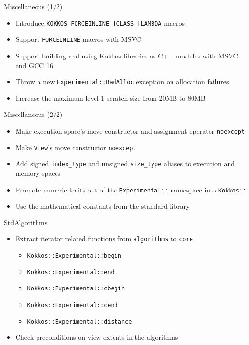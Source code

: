 \begin{frame}[fragile]{Miscellaneous (1/2)}
  \begin{itemize}
    \item Introduce \texttt{KOKKOS\_FORCEINLINE\_[CLASS\_]LAMBDA} macros
    \item Support \texttt{FORCEINLINE} macros with MSVC
    \item Support building and using Kokkos libraries as C++ modules with MSVC and GCC 16
    \item Throw a new \texttt{Experimental::BadAlloc} exception on allocation failures
    \item Increase the maximum level 1 scratch size from 20MB to 80MB
  \end{itemize}
\end{frame}


\begin{frame}[fragile]{Miscellaneous (2/2)}
  \begin{itemize}
    \item Make execution space's move constructor and assignment operator \texttt{noexcept}
    \item Make \texttt{View}'s move constructor \texttt{noexcept}
    \item Add signed \texttt{index\_type} and unsigned \texttt{size\_type} aliases to execution and memory spaces
    \item Promote numeric traits out of the \texttt{Experimental::} namespace into \texttt{Kokkos::}
    \item Use the mathematical constants from the standard library
  \end{itemize}
\end{frame}


\begin{frame}[fragile]{StdAlgorithms}
  \begin{itemize}
    \item Extract iterator related functions from \texttt{algorithms} to \texttt{core}
      \begin{itemize}
        \item \texttt{Kokkos::Experimental::begin}
        \item \texttt{Kokkos::Experimental::end}
        \item \texttt{Kokkos::Experimental::cbegin}
        \item \texttt{Kokkos::Experimental::cend}
        \item \texttt{Kokkos::Experimental::distance}
      \end{itemize}
    \item Check preconditions on view extents in the algorithms
  \end{itemize}
\end{frame}
